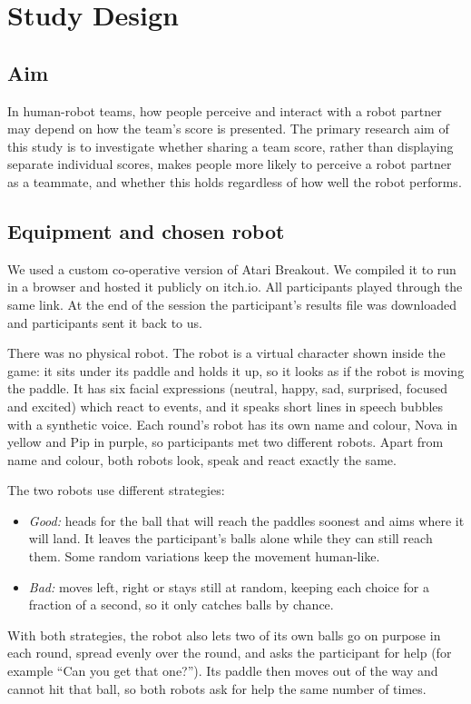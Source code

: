 \section{Study Design}

\subsection{Aim}
In human-robot teams, how people perceive and interact with a robot partner may depend on how the team's score is presented. The primary research aim of this study is to investigate whether sharing a team score, rather than displaying separate individual scores, makes people more likely to perceive a robot partner as a teammate, and whether this holds regardless of how well the robot performs.


\subsection{Equipment and chosen robot}
We used a custom co-operative version of Atari Breakout. We compiled it to run in a browser and hosted it publicly on itch.io. All participants played through the same link. At the end of the session the participant's results file was downloaded and participants sent it back to us.

There was no physical robot. The robot is a virtual character shown inside the game: it sits under its paddle and holds it up, so it looks as if the robot is moving the paddle. It has six facial expressions (neutral, happy, sad, surprised, focused and excited) which react to events, and it speaks short lines in speech bubbles with a synthetic voice. Each round's robot has its own name and colour, Nova in yellow and Pip in purple, so participants met two different robots. Apart from name and colour, both robots look, speak and react exactly the same.

The two robots use different strategies:
\begin{itemize}
    \item \textit{Good:} heads for the ball that will reach the paddles soonest and aims where it will land. It leaves the participant's balls alone while they can still reach them. Some random variations keep the movement human-like.
    \item \textit{Bad:} moves left, right or stays still at random, keeping each choice for a fraction of a second, so it only catches balls by chance.
\end{itemize}
With both strategies, the robot also lets two of its own balls go on purpose in each round, spread evenly over the round, and asks the participant for help (for example ``Can you get that one?''). Its paddle then moves out of the way and cannot hit that ball, so both robots ask for help the same number of times.

